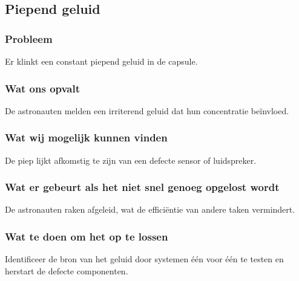 \subsection{Piepend geluid}

\subsubsection{Probleem}
Er klinkt een constant piepend geluid in de capsule.

\subsubsection{Wat ons opvalt}
De astronauten melden een irriterend geluid dat hun concentratie beïnvloed.

\subsubsection{Wat wij mogelijk kunnen vinden}
De piep lijkt afkomstig te zijn van een defecte sensor of luidspreker.

\subsubsection{Wat er gebeurt als het niet snel genoeg opgelost wordt}
De astronauten raken afgeleid, wat de efficiëntie van andere taken vermindert.

\subsubsection{Wat te doen om het op te lossen}
Identificeer de bron van het geluid door systemen één voor één te testen en herstart de defecte componenten.